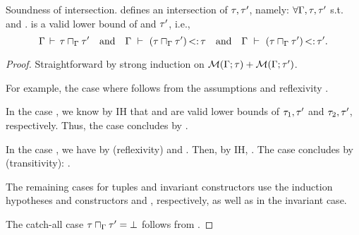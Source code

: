 \begin{theorem}{Soundness of intersection.}%
\label{thm:meet-sound}
     defines an intersection of $\tau, \tau'$, namely:
    $\forall \Gamma, \tau, \tau'$ s.t. \tyvld{}{\AEnv}
    and .
     is a valid lower bound
    of \ty and $\tau'$, i.e., 
    \[
        \Gamma\,\vdash\,\tau \sqcap_{\Gamma} \tau'
        \quad\text{and}\quad
        \Gamma\ \vdash\ (\tau \sqcap_{\Gamma} \tau') \operatorname{<:} \tau
        \quad\text{and}\quad
        \Gamma\ \vdash\ (\tau \sqcap_{\Gamma} \tau') \operatorname{<:} \tau'.
    \]
\end{theorem}
\begin{proof}
    Straightforward by strong induction on
    $\operatorname{\mathcal{M}}(\Gamma;\tau) + \operatorname{\mathcal{M}}(\Gamma;\tau')$.

    For example, the case where  follows from
    the assumptions and reflexivity \subtydflt{\ty}{\ty}.

    In the case ,
    we know by IH that  and 
    are valid lower bounds of $\tau_1,\tau'$ and $\tau_2,\tau'$, respectively.
    Thus, the case concludes by .

    In the case , we have \subtydflt{\tylb}{\vany}
    by  (reflexivity) and .
    Then, by IH, .
    The case concludes by  (transitivity):
    .
    
    The remaining cases for tuples and invariant constructors
    use the induction hypotheses and constructors  and ,
    respectively, as well as 
    in the invariant case.

    The catch-all case $\tau \sqcap_{\Gamma} \tau' = \bot$
    follows from .
\end{proof}

